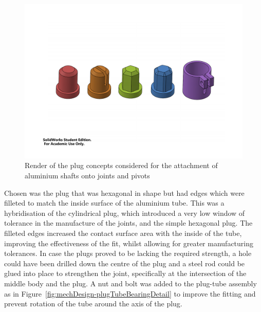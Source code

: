         \begin{figure}
        \centering
        \includegraphics[clip, trim=3cm 6cm 3cm 6cm, width=1\linewidth]{figures/plug-concepts}
        \caption[Render of the plug concepts considered for the attachment of aluminium shafts onto joints and pivots]{Render of the plug concepts considered for the attachment of aluminium shafts onto joints and pivots}
        \label{fig:mechDesign-plugConcepts}
        \end{figure}
        
        Chosen was the plug that was hexagonal in shape but had edges which were filleted to match the inside surface of the aluminium tube. This was a hybridisation of the cylindrical plug, which introduced a very low window of tolerance in the manufacture of the joints, and the simple hexagonal plug. The filleted edges increased the contact surface area with the inside of the tube, improving the effectiveness of the fit, whilst allowing for greater manufacturing tolerances. In case the plugs proved to be lacking the required strength, a hole could have been drilled down the centre of the plug and a steel rod could be glued into place to strengthen the joint, specifically at the intersection of the middle body and the plug. A nut and bolt was added to the plug-tube assembly as in Figure~\ref{fig:mechDesign-plugTubeBearingDetail} to improve the fitting and prevent rotation of the tube around the axis of the plug.
        
